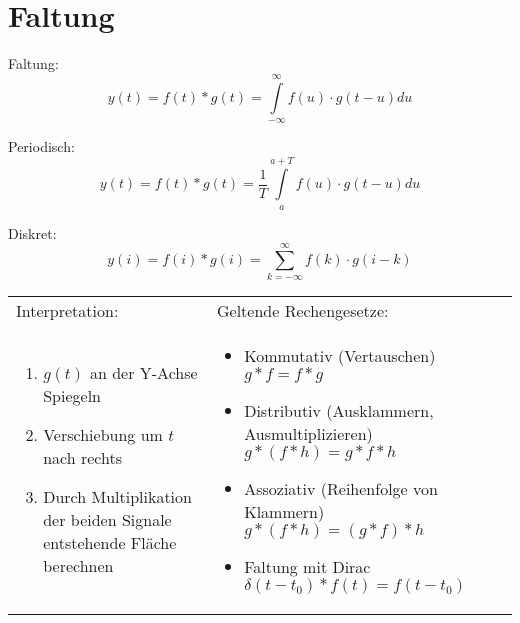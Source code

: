 \section{Faltung}
Faltung:
\begin{equation}
  \nonumber
  y(t) = f(t) \ast g(t) = \int\limits_{-\infty}^{\infty}f(u) \cdot g(t-u) du
\end{equation}

Periodisch:
\begin{equation}
  \nonumber
  y(t) = f(t) \ast g(t) = \frac{1}{T}\int\limits_{a}^{a + T}f(u) \cdot g(t-u) du
\end{equation}

Diskret:
\begin{equation}
  \nonumber
  y(i)=f(i) \ast g(i)=\sum\limits_{k=-\infty}^{\infty}f(k)\cdot g(i-k)
\end{equation}

\begin{tabular}{p{9cm}p{9cm}}
  Interpretation: & Geltende Rechengesetze:\\
  \begin{enumerate}
    \item $g(t)$ an der Y-Achse Spiegeln
	  \item Verschiebung um $t$ nach rechts
	  \item Durch Multiplikation der beiden Signale entstehende Fläche berechnen
  \end{enumerate}
&
  \begin{itemize}
    \item Kommutativ (Vertauschen) $g \ast f = f \ast g $
	  \item Distributiv (Ausklammern, Ausmultiplizieren) $g \ast(f \ast h) = g \ast f \ast h$
	  \item Assoziativ (Reihenfolge von Klammern) $g \ast(f \ast h) = (g \ast f) \ast h$
	  \item Faltung mit Dirac $\delta(t-t_0) \ast f(t) = f(t-t_0)$
  \end{itemize}
\end{tabular}
	
	
	
